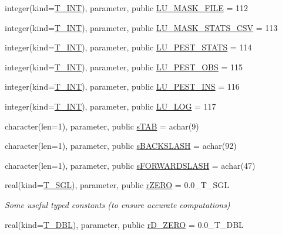 \begin{DoxyCompactItemize}
integer(kind=\hyperlink{namespacetypes_a4e4d040a4425196c4d43be63e7e6103a}{T\_\-INT}), parameter, public \hyperlink{namespacetypes_a6fbb2101460a97abcc5f4ee9055e7e63}{LU\_\-MASK\_\-FILE} = 112
\item 
integer(kind=\hyperlink{namespacetypes_a4e4d040a4425196c4d43be63e7e6103a}{T\_\-INT}), parameter, public \hyperlink{namespacetypes_abaf10a4311ff42ab5244e8246c6a5200}{LU\_\-MASK\_\-STATS\_\-CSV} = 113
\item 
integer(kind=\hyperlink{namespacetypes_a4e4d040a4425196c4d43be63e7e6103a}{T\_\-INT}), parameter, public \hyperlink{namespacetypes_a8ef944fc47b1e170df34b54eba5a9433}{LU\_\-PEST\_\-STATS} = 114
\item 
integer(kind=\hyperlink{namespacetypes_a4e4d040a4425196c4d43be63e7e6103a}{T\_\-INT}), parameter, public \hyperlink{namespacetypes_afb3d31ed372313e730716e33e42c735a}{LU\_\-PEST\_\-OBS} = 115
\item 
integer(kind=\hyperlink{namespacetypes_a4e4d040a4425196c4d43be63e7e6103a}{T\_\-INT}), parameter, public \hyperlink{namespacetypes_a8897682c60c1fbc7595e60937266dfc3}{LU\_\-PEST\_\-INS} = 116
\item 
integer(kind=\hyperlink{namespacetypes_a4e4d040a4425196c4d43be63e7e6103a}{T\_\-INT}), parameter, public \hyperlink{namespacetypes_a6b30bc5adf5ad8e9498b0a9081078fe5}{LU\_\-LOG} = 117
\item 
character(len=1), parameter, public \hyperlink{namespacetypes_a1aba85f347398a7d96a17c88c664c7a1}{sTAB} = achar(9)
\item 
character(len=1), parameter, public \hyperlink{namespacetypes_a7ac07dde59c21f645da2f523cc34afe1}{sBACKSLASH} = achar(92)
\item 
character(len=1), parameter, public \hyperlink{namespacetypes_a75630efc0939bd3b2b2c5913d58c55f4}{sFORWARDSLASH} = achar(47)
\item 
real(kind=\hyperlink{namespacetypes_af3012489af4c138f271f1bce244b7e51}{T\_\-SGL}), parameter, public \hyperlink{namespacetypes_accfc31d1cd5f1a46b3fb99e6d1975a6b}{rZERO} = 0.0\_\-T\_\-SGL
\begin{DoxyCompactList}\small\item\em Some useful typed constants (to ensure accurate computations) \item\end{DoxyCompactList}\item 
real(kind=\hyperlink{namespacetypes_a888737411068474a167b1c3e5b579c58}{T\_\-DBL}), parameter, public \hyperlink{namespacetypes_af4d6e7a6f7dfdf6df6fa94bcd6af757f}{rD\_\-ZERO} = 0.0\_\-T\_\-DBL

\end{DoxyCompactItemize}
